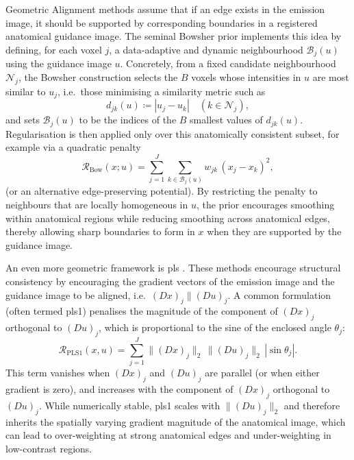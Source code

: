 Geometric Alignment methods assume that if an edge exists in the emission image, it should be supported by corresponding boundaries in a registered anatomical guidance image. The seminal Bowsher prior \cite{bowsherUtilizingMRIInformation2004} implements this idea by defining, for each voxel $j$, a data-adaptive and dynamic neighbourhood $\mathcal{B}_j(u)$ using the guidance image $u$. Concretely, from a fixed candidate neighbourhood $\mathcal{N}_j$, the Bowsher construction selects the $B$ voxels whose intensities in $u$ are most similar to $u_j$, i.e.\ those minimising a similarity metric such as
\begin{equation}
    d_{jk}(u) \coloneqq |u_j-u_k| \quad (k\in\mathcal{N}_j),
\end{equation}
and sets $\mathcal{B}_j(u)$ to be the indices of the $B$ smallest values of $d_{jk}(u)$. Regularisation is then applied only over this anatomically consistent subset, for example via a quadratic penalty
\begin{equation}
    \mathcal{R}_{\mathrm{Bow}}(x;u)
    = \sum_{j=1}^J \sum_{k\in \mathcal{B}_j(u)} w_{jk}\,(x_j-x_k)^2,
\end{equation}
(or an alternative edge-preserving potential). By restricting the penalty to neighbours that are locally homogeneous in $u$, the prior encourages smoothing within anatomical regions while reducing smoothing across anatomical edges, thereby allowing sharp boundaries to form in $x$ when they are supported by the guidance image.

An even more geometric framework is \gls{pls} \cite{ehrhardtVectorValuedImageProcessing2014}. These methods encourage structural consistency by encouraging the gradient vectors of the emission image and the guidance image to be aligned, i.e.\ $(D x)_j \parallel (D u)_j$. A common formulation (often termed \gls{pls}1) penalises the magnitude of the component of $(D x)_j$ orthogonal to $(D u)_j$, which is proportional to the sine of the enclosed angle $\theta_j$:
\begin{equation}
    \mathcal{R}_{\mathrm{PLS1}}(x,u)
    = \sum_{j=1}^J \|(D x)_j\|_2\,\|(D u)_j\|_2\,|\sin\theta_j|.
\end{equation}
This term vanishes when $(D x)_j$ and $(D u)_j$ are parallel (or when either gradient is zero), and increases with the component of $(D x)_j$ orthogonal to $(D u)_j$. While numerically stable, \gls{pls}1 scales with $\|(D u)_j\|_2$ and therefore inherits the spatially varying gradient magnitude of the anatomical image, which can lead to over-weighting at strong anatomical edges and under-weighting in low-contrast regions.

